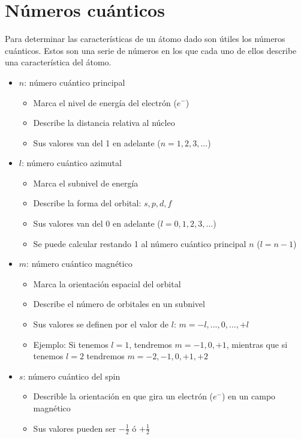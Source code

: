 \section{Números cuánticos}

Para determinar las características de un átomo dado son útiles los números cuánticos. Estos son una serie de números en los que cada uno de ellos describe una característica del átomo. 

\begin{itemize}
    \item $n$: número cuántico principal
        \begin{itemize}
            \item Marca el nivel de energía del electrón ($e^{-}$)
            \item Describe la distancia relativa al núcleo
            \item Sus valores van del 1 en adelante ($n=1,2,3,...$)
        \end{itemize}
    
    \item $l$: número cuántico azimutal
        \begin{itemize}
            \item Marca el subnivel de energía
            \item Describe la forma del orbital: $s,p,d,f$
            \item Sus valores van del 0 en adelante ($l=0,1,2,3,...$)
            \item Se puede calcular restando 1 al número cuántico principal $n$ ($l=n-1$)
        \end{itemize}
    
    
    \item $m$: número cuántico magnético
        \begin{itemize}
            \item Marca la orientación espacial del orbital
            \item Describe el número de orbitales en un subnivel
            \item Sus valores se definen por el valor de $l$: $m=-l,...,0,...,+l$
    	    \item Ejemplo: Si tenemos $l=1$, tendremos $m=-1,0,+1$, mientras que si tenemos $l=2$ tendremos $m=-2,-1,0,+1,+2$
        \end{itemize}
    
    
    \item $s$: número cuántico del spin
        \begin{itemize}
            \item Describle la orientación en que gira un electrón ($e^{-}$) en un campo magnético
            \item Sus valores pueden ser $-\frac{1}{2}$ ó $+\frac{1}{2}$
        \end{itemize}
    
\end{itemize}


